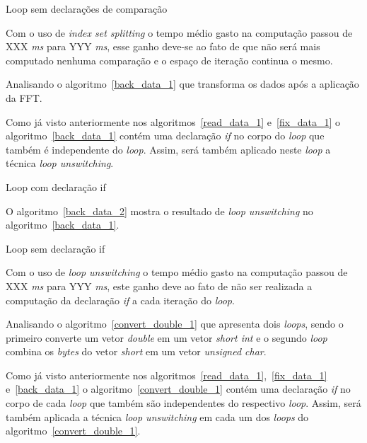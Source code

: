 \begin{algorithm}
\caption{Loop sem declarações de comparação}
\label{equalize_2}

\end{algorithm}

Com o uso de \textit{index set splitting} o tempo médio gasto na computação
passou de XXX \textit{ms} para YYY \textit{ms}, esse ganho deve-se ao fato de
que não será mais computado nenhuma comparação e o espaço de iteração continua o
mesmo.


Analisando o algoritmo~\ref{back_data_1} que transforma os dados após a
aplicação da FFT.

Como já visto anteriormente nos algoritmos~\ref{read_data_1} e~\ref{fix_data_1}
o algoritmo~\ref{back_data_1} contém uma declaração \textit{if} no corpo do
\textit{loop} que também é independente do \textit{loop}. Assim, será também
aplicado neste \textit{loop} a técnica \textit{loop unswitching}.

\begin{algorithm}
\caption{Loop com declaração if }
\label{back_data_1}

\end{algorithm}

O algoritmo~\ref{back_data_2} mostra o resultado de \textit{loop unswitching} no
algoritmo~\ref{back_data_1}.

\begin{algorithm}
\caption{Loop sem declaração if }
\label{back_data_2}

\end{algorithm}

Com o uso de \textit{loop unswitching} o tempo médio gasto na computação passou
de XXX \textit{ms} para YYY \textit{ms}, este ganho deve ao fato de não ser
realizada a computação da declaração \textit{if} a cada iteração do
\textit{loop}.


Analisando o algoritmo~\ref{convert_double_1} que apresenta dois \textit{loops},
sendo o primeiro converte um vetor \textit{double} em um vetor 
\textit{short int} e o segundo \textit{loop} combina os \textit{bytes} do vetor
\textit{short} em um vetor \textit{unsigned char}.

Como já visto anteriormente nos algoritmos~\ref{read_data_1},~\ref{fix_data_1} 
e~\ref{back_data_1} 
o algoritmo~\ref{convert_double_1} contém uma declaração \textit{if} no corpo de
cada \textit{loop} que também são independentes do respectivo \textit{loop}. 
Assim, será também aplicada a técnica \textit{loop unswitching} em cada um dos
\textit{loops} do algoritmo~\ref{convert_double_1}.



